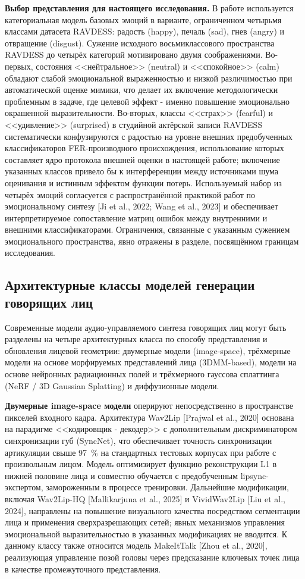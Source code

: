 \documentclass[a4paper, 12pt, oneside, openany]{article}
\begin{document}
\textbf{Выбор представления для настоящего исследования.} В работе используется категориальная модель базовых эмоций в варианте, ограниченном четырьмя классами датасета RAVDESS: радость (happy), печаль (sad), гнев (angry) и отвращение (disgust). Сужение исходного восьмиклассового пространства RAVDESS до четырёх категорий мотивировано двумя соображениями. Во-первых, состояния <<нейтральное>> (neutral) и <<спокойное>> (calm) обладают слабой эмоциональной выраженностью и низкой различимостью при автоматической оценке мимики, что делает их включение методологически проблемным в задаче, где целевой эффект - именно повышение эмоционально окрашенной выразительности. Во-вторых, классы <<страх>> (fearful) и <<удивление>> (surprised) в студийной актёрской записи RAVDESS систематически конфузируются с радостью на уровне внешних предобученных классификаторов FER-производного происхождения, использование которых составляет ядро протокола внешней оценки в настоящей работе; включение указанных классов привело бы к интерференции между источниками шума оценивания и истинным эффектом функции потерь. Используемый набор из четырёх эмоций согласуется с распространённой практикой работ по эмоциональному синтезу [Ji et al., 2022; Wang et al., 2023] и обеспечивает интерпретируемое сопоставление матриц ошибок между внутренними и внешними классификаторами. Ограничения, связанные с указанным сужением эмоционального пространства, явно отражены в разделе, посвящённом границам исследования.

\subsection{Архитектурные классы моделей генерации говорящих лиц}

Современные модели аудио-управляемого синтеза говорящих лиц могут быть разделены на четыре архитектурных класса по способу представления и обновления лицевой геометрии: двумерные модели (image-space), трёхмерные модели на основе морфируемых представлений лица (3DMM-based), модели на основе нейронных радиационных полей и трёхмерного гауссова сплаттинга (NeRF / 3D Gaussian Splatting) и диффузионные модели.

\textbf{Двумерные image-space модели} оперируют непосредственно в пространстве пикселей входного кадра. Архитектура Wav2Lip [Prajwal et al., 2020] основана на парадигме <<кодировщик - декодер>> с дополнительным дискриминатором синхронизации губ (SyncNet), что обеспечивает точность синхронизации артикуляции свыше 97~\% на стандартных тестовых корпусах при работе с произвольным лицом. Модель оптимизирует функцию реконструкции L1 в нижней половине лица и совместно обучается с предобученным lipsync-экспертом, замороженным в процессе тренировки. Дальнейшие модификации, включая Wav2Lip-HQ [Mallikarjuna et al., 2025] и VividWav2Lip [Liu et al., 2024], направлены на повышение визуального качества посредством сегментации лица и применения сверхразрешающих сетей; явных механизмов управления эмоциональной выразительностью в указанных модификациях не вводится. К данному классу также относится модель MakeItTalk [Zhou et al., 2020], реализующая управление позой головы через предсказание ключевых точек лица в качестве промежуточного представления.
\end{document}

